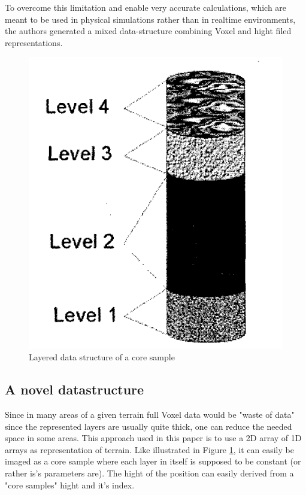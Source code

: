 To overcome this limitation and enable very accurate calculations, which are meant to be used in physical simulations rather than in realtime environments, the authors generated a mixed data-structure combining Voxel and hight filed representations.

\begin{figure}[htb]
	\centering
	\includegraphics[width=\linewidth]{MGG_10/snap1.png}
	\caption{Layered data structure of a core sample}
	\label{fig:coresample}
\end{figure}

\subsection{A novel datastructure}
Since in many areas of a given terrain full Voxel data would be "waste  of data" \cite{marechal2010heat} since the represented layers are usually quite thick, one can reduce the needed space in some areas. This approach used in this paper is to use a 2D array of 1D arrays as representation of terrain. Like illustrated in Figure \ref{fig:coresample}, it can easily be imaged as a core sample where each layer in itself is supposed to be constant (or rather is's parameters are). The hight of the position can easily derived from a "core samples" hight and it's index.

